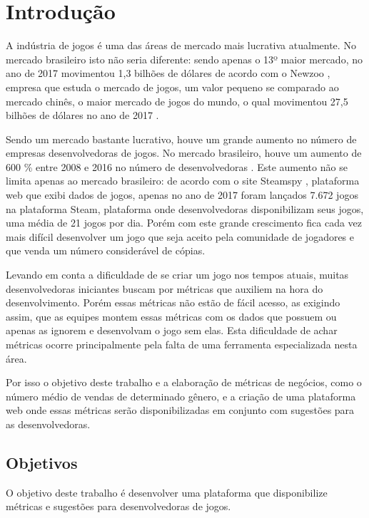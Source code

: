 \chapter*[Introdução]{Introdução}
A indústria de jogos é uma das áreas de mercado mais lucrativa atualmente. No mercado brasileiro isto não seria diferente: sendo apenas o 13º maior mercado, no ano de 2017 movimentou 1,3 bilhões de dólares de acordo com o Newzoo \cite{newzoo_brasil}, empresa que estuda o mercado de jogos, um valor pequeno se comparado ao mercado chinês, o maior mercado de jogos do mundo, o qual movimentou 27,5 bilhões de dólares no ano de 2017 \cite{newzoo_china}.

Sendo um mercado bastante lucrativo, houve um grande aumento no número de empresas desenvolvedoras de jogos. No mercado brasileiro, houve um aumento de 600 \% entre 2008 e 2016 no número de desenvolvedoras \cite{desenvolvedoras_crescimento}. Este aumento não se limita apenas ao mercado brasileiro: de acordo com o site Steamspy \cite{steam_spy}, plataforma web que exibi dados de jogos, apenas no ano de 2017 foram lançados 7.672 jogos na plataforma Steam, plataforma onde desenvolvedoras disponibilizam seus jogos, uma média de 21 jogos por dia. Porém com este grande crescimento fica cada vez mais difícil desenvolver um jogo que seja aceito pela comunidade de jogadores e que venda um número considerável de cópias.

Levando em conta a dificuldade de se criar um jogo nos tempos atuais, muitas desenvolvedoras iniciantes buscam por métricas que auxiliem na hora do desenvolvimento. Porém essas métricas não estão de fácil acesso, as exigindo assim, que as equipes montem essas métricas com os dados que possuem ou apenas as ignorem e desenvolvam o jogo sem elas. Esta dificuldade de achar métricas ocorre principalmente pela falta de uma ferramenta especializada nesta área.

Por isso o objetivo deste trabalho e a elaboração de métricas de negócios, como o número médio de vendas de determinado gênero, e a criação de uma plataforma web onde essas métricas serão disponibilizadas em conjunto com sugestões para as desenvolvedoras.

\section*{Objetivos}
	O objetivo deste trabalho é desenvolver uma plataforma que disponibilize métricas e sugestões para desenvolvedoras de jogos.
	

